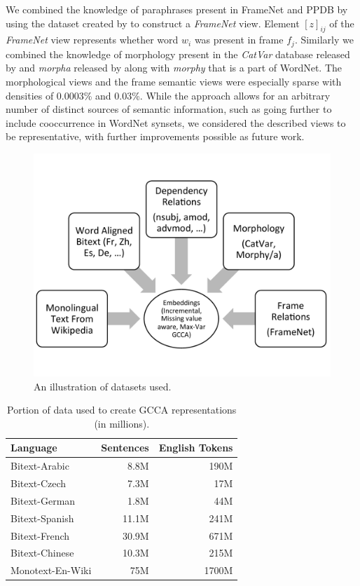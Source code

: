 \documentclass[11pt]{article}
\begin{document}
We combined the knowledge of paraphrases present in FrameNet and PPDB
by using the dataset created by  to
construct a \textit{FrameNet} view. Element $[z]_{ij}$ of the
\textit{FrameNet} view represents whether word $w_i$ was present in
frame $f_j$. Similarly we combined the knowledge of morphology present
in the \textit{CatVar} database released by 
and \textit{morpha} released by  along with \textit{morphy} that is a part of WordNet.
The morphological views and the frame semantic views were especially
sparse with densities of 0.0003\% and 0.03\%. While the approach
allows for an arbitrary number of distinct sources of semantic
information, such as going further to include cooccurrence in WordNet
synsets, we considered the described views to be representative, with
further improvements possible as future work.


\begin{figure}
  \includegraphics[trim=0 70 0 35,clip,width=\linewidth]{cartoonbw.pdf}
  \caption{An illustration of datasets used.}
  \label{fig:cartoon}
  \end{figure}


\begin{table}[htbp]
  \centering
  \begin{tabular}{lrr}
    Language & Sentences & English Tokens \\
    \hline
    Bitext-Arabic   & 8.8M   & 190M  \\
    Bitext-Czech    & 7.3M   & 17M   \\
    Bitext-German   & 1.8M   & 44M   \\
    Bitext-Spanish  & 11.1M  & 241M  \\
    Bitext-French   & 30.9M  & 671M  \\
    Bitext-Chinese  & 10.3M  & 215M  \\
    Monotext-En-Wiki& 75M    & 1700M 
  \end{tabular}  
  \caption{Portion of data used to create GCCA representations (in millions).}
  \label{tab:dataperlang}
\end{table}
\end{document}
